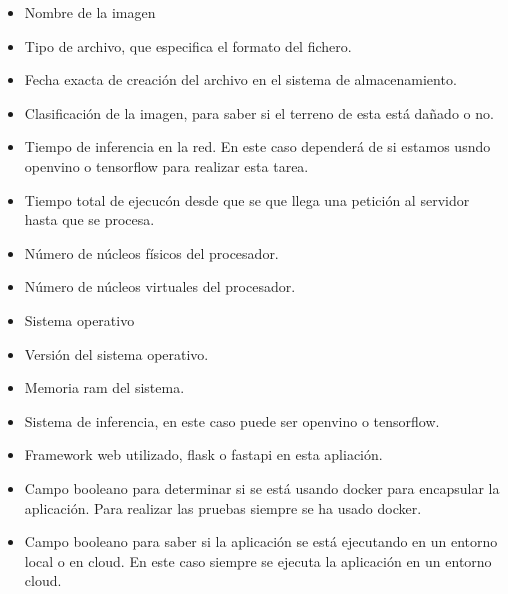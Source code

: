 \begin{itemize}
    \item Nombre de la imagen
    \item Tipo de archivo, que especifica el formato del fichero.
    \item Fecha exacta de creación del archivo en el sistema de almacenamiento.
    \item Clasificación de la imagen, para saber si el terreno de esta está dañado o no.
    \item Tiempo de inferencia en la red.
    En este caso dependerá de si estamos usndo openvino o tensorflow para realizar esta tarea.
    \item Tiempo total de ejecucón desde que se que llega una petición al servidor hasta que se procesa.
    \item Número de núcleos físicos del procesador.
    \item Número de núcleos virtuales del procesador.
    \item Sistema operativo
    \item Versión del sistema operativo.
    \item Memoria ram del sistema.
    \item Sistema de inferencia, en este caso puede ser openvino o tensorflow.
    \item Framework web utilizado, flask o fastapi en esta apliación.
    \item Campo booleano para determinar si se está usando docker para encapsular la aplicación.
    Para realizar las pruebas siempre se ha usado docker.
    \item Campo booleano para saber si la aplicación se está ejecutando en un entorno local o en cloud.
    En este caso siempre se ejecuta la aplicación en un entorno cloud.
\end{itemize}


